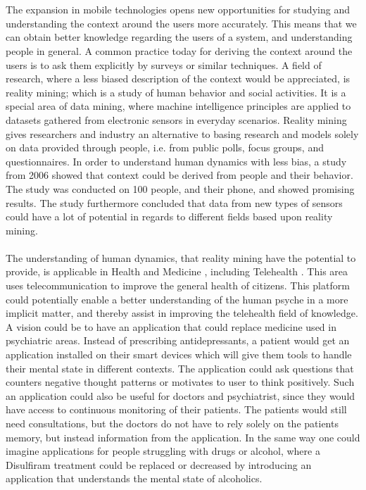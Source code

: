 \\\\
The expansion in mobile technologies opens new opportunities for studying and understanding the context around the users more accurately. This means that we can obtain better knowledge regarding the users of a system, and understanding people in general. A common practice today for deriving the context around the users is to ask them explicitly by surveys or similar techniques. A field of research, where a less biased description of the context would be appreciated, is reality mining; which is a study of human behavior and social activities. It is a special area of data mining, where machine intelligence principles are applied to datasets gathered from electronic sensors in everyday scenarios. Reality mining gives researchers and industry an alternative to basing research and models solely on data provided through people, i.e. from public polls, focus groups, and questionnaires. In order to understand human dynamics with less bias, a study from 2006 \parencite{eagle2006_reality_mining_definition} showed that context could be derived from people and their behavior. The study was conducted on 100 people, and their phone, and showed promising results. The study furthermore concluded that data from new types of sensors could have a lot of potential in regards to different fields based upon reality mining. 
\\\\
The understanding of human dynamics, that reality mining have the potential to provide, is applicable in Health and Medicine \parencite{pentland2009_reality_mining_health_medicine}, including Telehealth \parencite{telehealth_aau}. This area uses telecommunication to improve the general health of citizens. This platform could potentially enable a better understanding of the human psyche in a more implicit matter, and thereby assist in improving the telehealth field of knowledge. A vision could be to have an application that could replace medicine used in psychiatric areas. Instead of prescribing antidepressants, a patient would get an application installed on their smart devices which will give them tools to handle their mental state in different contexts. The application could ask questions that counters negative thought patterns or motivates to user to think positively. Such an application could also be useful for doctors and psychiatrist, since they would have access to continuous monitoring of their patients. The patients would still need consultations, but the doctors do not have to rely solely on the patients memory, but instead information from the application. In the same way one could imagine applications for people struggling with drugs or alcohol, where a Disulfiram \parencite{nlm_disulfiram} treatment could be replaced or decreased by introducing an application that understands the mental state of alcoholics.
